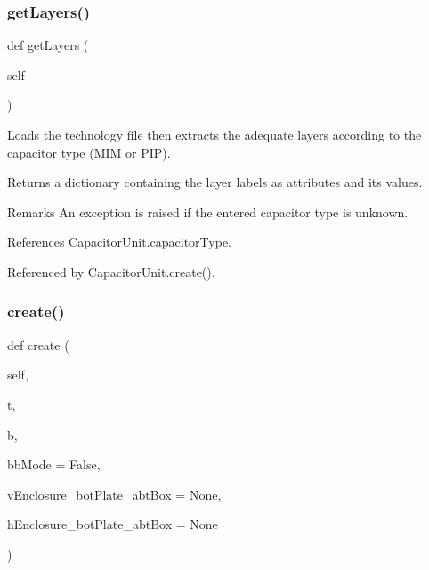 \subsubsection{\texorpdfstring{get\+Layers()}{getLayers()}}
{\footnotesize\ttfamily def get\+Layers (\begin{DoxyParamCaption}\item[{}]{self }\end{DoxyParamCaption})}



Loads the technology file then extracts the adequate layers according to the capacitor type (M\+IM or P\+IP). 

\begin{DoxyReturn}{Returns}
a dictionary containing the layer labels as attributes and its values. 
\end{DoxyReturn}
\begin{DoxyRemark}{Remarks}
An exception is raised if the entered capacitor type is unknown. 
\end{DoxyRemark}


References Capacitor\+Unit.\+capacitor\+Type.



Referenced by Capacitor\+Unit.\+create().

\mbox{\label{classpython_1_1capacitorunit_1_1CapacitorUnit_acd7ed0a77e223a638c85d07aed261b9f}} 
\subsubsection{\texorpdfstring{create()}{create()}}
{\footnotesize\ttfamily def create (\begin{DoxyParamCaption}\item[{}]{self,  }\item[{}]{t,  }\item[{}]{b,  }\item[{}]{bb\+Mode = {\ttfamily False},  }\item[{}]{v\+Enclosure\+\_\+bot\+Plate\+\_\+abt\+Box = {\ttfamily None},  }\item[{}]{h\+Enclosure\+\_\+bot\+Plate\+\_\+abt\+Box = {\ttfamily None} }\end{DoxyParamCaption})}



